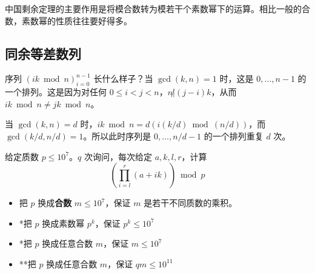 中国剩余定理的主要作用是将模合数转为模若干个素数幂下的运算。相比一般的合数，素数幂的性质往往要好得多。

\subsection{同余等差数列}

序列 $(ik\bmod n)_{i=0}^{n-1}$ 长什么样子？当 $\gcd(k,n)=1$ 时，这是 $0,\ldots,n-1$ 的一个排列。这是因为对任何 $0\le i<j<n$，$n\not|(j-i)k$，从而 $ik\bmod n\ne jk\bmod n$。

当 $\gcd(k,n)=d$ 时，$ik\bmod n=d(i(k/d)\bmod (n/d))$，而 $\gcd(k/d,n/d)=1$。所以此时序列是 $0,\ldots,n/d-1$ 的一个排列重复 $d$ 次。

\begin{exercise}
    给定质数 $p\le 10^7$。$q$ 次询问，每次给定 $a,k,l,r$，计算
    $$
    \left(\prod_{i=l}^{r}(a+ik)\right)\bmod p
    $$
\end{exercise}
\begin{exercise}
    \begin{itemize}
        \item 把 $p$ 换成\textbf{合数} $m\le 10^7$，保证 $m$ 是若干不同质数的乘积。
        \item *把 $p$ 换成素数幂 $p^k$，保证 $p^k\le 10^7$
        \item *把 $p$ 换成任意合数 $m$，保证 $m\le 10^7$
        \item **把 $p$ 换成任意合数 $m$，保证 $qm\le 10^11$
    \end{itemize}
\end{exercise}
